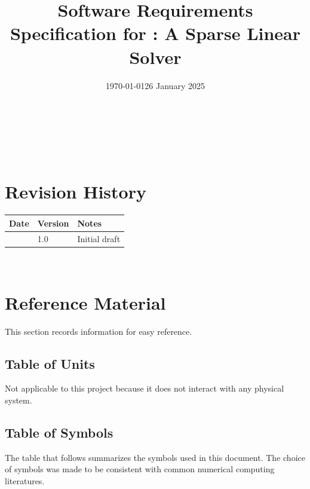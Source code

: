 \documentclass[12pt]{article}
\begin{document}
\title{Software Requirements Specification for \progname: A Sparse Linear Solver}
\author{\authname}
\date{\today}

\maketitle

~\newpage


\tableofcontents

~\newpage

\section*{Revision History}

\begin{tabularx}{\textwidth}{p{3cm}p{2cm}X}
  \toprule {\bf Date} & {\bf Version} & {\bf Notes} \\
  \midrule
  \date{26 January 2025} & 1.0 & Initial draft \\
  \bottomrule
\end{tabularx}

~\newpage

\section{Reference Material}

This section records information for easy reference.

\subsection{Table of Units}

Not applicable to this project because it does not interact with any physical
system.

\subsection{Table of Symbols}

The table that follows summarizes the symbols used in this document. The choice
of symbols was made to be consistent with common numerical computing
literatures.
\end{document}
